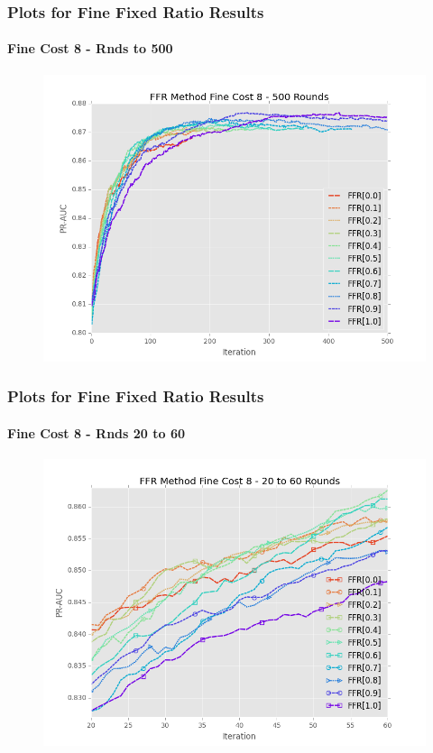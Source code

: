 \documentclass{beamer}
\begin{document}
\begin{frame}
    \frametitle{Plots for Fine Fixed Ratio Results}  %
    \framesubtitle{Fine Cost 8 - Rnds to 500}
    \begin{figure}[!htb]
        \centering
        \includegraphics[width=0.8\columnwidth]{fig/ParamsFFR_PR_Cost8_rnds0_500}
        \label{fig:ParamsFFR_PR_Cost8_rnds0_500}
    \end{figure}
\end{frame}
\begin{frame}
    \frametitle{Plots for Fine Fixed Ratio Results}  %
    \framesubtitle{Fine Cost 8 - Rnds 20 to 60}
    \begin{figure}[!htb]
        \centering
        \includegraphics[width=0.8\columnwidth]{fig/ParamsFFR_PR_Cost8_rnds20_60}
        \label{fig:ParamsFFR_PR_Cost8_rnds20_60}
    \end{figure}
\end{frame}
\end{document}
